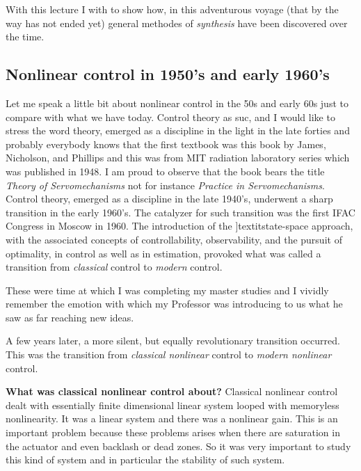 \documentclass{article}
\begin{document}
With this lecture I with to show how, in this adventurous voyage (that by the way has not ended yet) general methodes of \textit{synthesis} have been discovered over the time.

\subsection*{Nonlinear control in 1950's and early 1960's}
Let me speak a little bit about nonlinear control in the 50s and early 60s just to compare with what we have today. Control theory as suc, and I would like to stress the word theory, emerged as a discipline in the light in the late forties and probably everybody knows that the first textbook was this book by James, Nicholson, and Phillips and this was from MIT radiation laboratory series which was published in 1948. I am proud to observe that the book bears the title \textit{Theory of Servomechanisms} not for instance \textit{Practice in Servomechanisms}.  Control theory, emerged as a discipline in the late 1940's, underwent a sharp transition in the early 1960's. The catalyzer for such transition was the first IFAC Congress in Moscow in 1960. The introduction of the ]textit{state-space} approach, with the associated concepts of controllability, observability, and the pursuit of optimality, in control as well as in estimation, provoked what was called a transition from \textit{classical} control to \textit{modern} control.

These were time at which I was completing my master studies and I vividly remember the emotion with which my Professor was introducing to us what he saw as far reaching new ideas.

A few years later, a more silent, but equally revolutionary transition occurred. This was the transition from \textit{classical nonlinear} control to \textit{modern nonlinear} control.

\noindent
\textbf{What was classical nonlinear control about?}
Classical nonlinear control dealt with essentially finite dimensional linear system looped with memoryless nonlinearity. It was a linear system and there was a nonlinear gain. This is an important problem because these problems arises when there are saturation in the actuator and even backlash or dead zones. So it was very important to study this kind of system and in particular the stability of such system.
\end{document}
